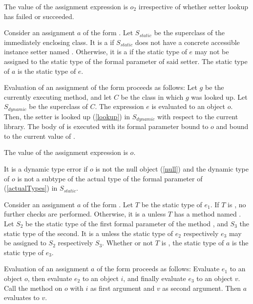 \documentclass[makeidx]{article}
\begin{document}
{\LMHash{}%
The value of the assignment expression is $o_2$
irrespective of whether setter lookup has failed or succeeded.
\EndCase

\LMHash{}%
Consider an assignment $a$ of the form .
Let $S_{static}$ be the superclass of the immediately enclosing class.
It is a  if $S_{static}$ does not have
a concrete accessible instance setter named .
Otherwise, it is a  if the static type of $e$
may not be assigned to the static type of the formal parameter of said setter.
The static type of $a$ is the static type of $e$.

\LMHash{}%
Evaluation of an assignment of the form 
proceeds as follows:
Let $g$ be the currently executing method, and let $C$ be
the class in which $g$ was looked up.
Let $S_{dynamic}$ be the superclass of $C$.
The expression $e$ is evaluated to an object $o$.
Then, the setter  is looked up (\ref{lookup})
in $S_{dynamic}$ with respect to the current library.
The body of  is executed with its formal parameter bound to $o$
and \THIS{} bound to the current value of \THIS.


\LMHash{}%
The value of the assignment expression is $o$.

\LMHash{}%
It is a dynamic type error if $o$ is not the null object (\ref{null})
and the dynamic type of $o$ is
not a subtype of the actual type of the formal parameter of 
(\ref{actualTypes}) in $S_{static}$.
\EndCase

\LMHash{}%
Consider an assignment $a$ of the form .
Let $T$ be the static type of $e_1$.
If $T$ is \DYNAMIC, no further checks are performed.
Otherwise, it is a  unless
$T$ has a method named \code{[]=}.
Let $S_2$ be the static type of the
first formal parameter of the method \code{[]=},
and $S_3$ the static type of the second.
It is a
 unless the static type of $e_2$ respectively $e_3$
may be assigned to $S_2$ respectively $S_3$.
Whether or not $T$ is \DYNAMIC,
the static type of $a$ is the static type of $e_3$.

\LMHash{}%
Evaluation of an assignment $a$ of the form 
proceeds as follows:
Evaluate $e_1$ to an object $o$,
then evaluate $e_2$ to an object $i$,
and finally evaluate $e_3$ to an object $v$.
Call the method \code{[]=} on $o$
with $i$ as first argument and $v$ as second argument.
Then $a$ evaluates to $v$.
\EndCase

}
\end{document}
